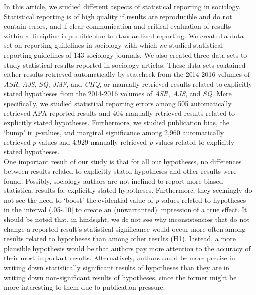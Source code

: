 \documentclass[
  12pt,
]{article}
\begin{document}
In this article, we studied different aspects of statistical reporting
in sociology. Statistical reporting is of high quality if results are
reproducible and do not contain errors, and if clear communication and
critical evaluation of results within a discipline is possible due to
standardized reporting. We created a data set on reporting guidelines in
sociology with which we studied statistical reporting guidelines of 143
sociology journals. We also created three data sets to study statistical
results reported in sociology articles. These data sets contained either
results retrieved automatically by statcheck from the 2014-2016 volumes
of \emph{ASR}, \emph{AJS}, \emph{SQ}, \emph{JMF}, and \emph{CHQ}, or
manually retrieved results related to explicitly stated hypotheses from
the 2014-2016 volumes of \emph{ASR}, \emph{AJS}, and \emph{SQ}. More
specifically, we studied statistical reporting errors among 505
automatically retrieved APA-reported results and 404 manually retrieved
results related to explicitly stated hypotheses. Furthermore, we studied
publication bias, the `bump' in \emph{p}-values, and marginal
significance among 2,960 automatically retrieved \emph{p}-values and
4,929 manually retrieved \emph{p}-values related to explicitly stated
hypotheses.~\\
\hspace*{0.333em}\hspace*{0.333em}\hspace*{0.333em}\hspace*{0.333em}One
important result of our study is that for all our hypotheses, no
differences between results related to explicitly stated hypotheses and
other results were found. Possibly, sociology authors are not inclined
to report more biased statistical results for explicitly stated
hypotheses. Furthermore, they seemingly do not see the need to `boost'
the evidential value of \emph{p}-values related to hypotheses in the
interval (.05-.10{]} to create an (unwarranted) impression of a true
effect. It should be noted that, in hindsight, we do not see why
inconsistencies that do not change a reported result's statistical
significance would occur more often among results related to hypotheses
than among other results (H1). Instead, a more plausible hypothesis
would be that authors pay more attention to the accuracy of their most
important results. Alternatively, authors could be more precise in
writing down statistically significant results of hypotheses than they
are in writing down non-significant results of hypotheses, since the
former might be more interesting to them due to publication pressure.
\end{document}
